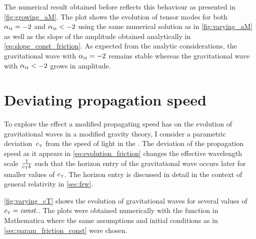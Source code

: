 \documentclass[12pt,parskip=half]{scrreprt}
\begin{document}
The numerical result obtained before reflects this behaviour as presented in \autoref{fig:growing_aM}. The plot shows the evolution of tensor modes for both \({\alpha_{\textnormal{\tiny{M}}}} = -2\) and \({\alpha_{\textnormal{\tiny{M}}}} < -2\) using the same numerical solution as in \autoref{fig:varying_aM} as well as the slope of the amplitude obtained analytically in \eqref{eq:slope_const_friction}. As expected from the analytic considerations, the gravitational wave with \({\alpha_{\textnormal{\tiny{M}}}} = -2\) remains stable whereas the gravitational wave with \({\alpha_{\textnormal{\tiny{M}}}} < -2\) grows in amplitude.



\section{Deviating propagation speed}\label{sec:param_dev_prop_speed}

To explore the effect a modified propagating speed has on the evolution of gravitational waves in a modified gravity theory, I consider a parametric deviation~\({c_{\textnormal{\tiny{T}}}}\) from the speed of light in the . The deviation of the propagation speed as it appears in \eqref{eq:evolution_friction} changes the effective wavelength scale \(\frac{1}{{c_{\textnormal{\tiny{T}}}} k}\) such that the horizon entry of the gravitational wave occurs later for smaller values of \({c_{\textnormal{\tiny{T}}}}\). The horizon entry is discussed in detail in the context of general relativity in \autoref{sec:frw}.

\autoref{fig:varying_cT} shows the evolution of gravitational waves for several values of \({c_{\textnormal{\tiny{T}}}}=\textnormal{\textit{const.}}\). The plots were obtained numerically with the  function in Mathematica where the same assumptions and initial conditions as in \autoref{sec:param_friction_const} were chosen.

\end{document}
